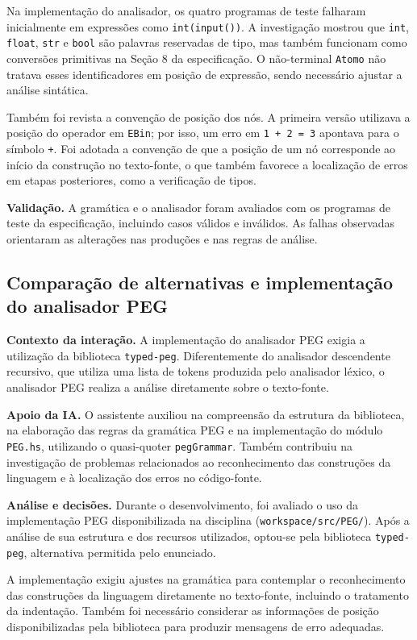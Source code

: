 Na implementação do analisador, os quatro programas de teste
falharam inicialmente em expressões como \texttt{int(input())}.
A investigação mostrou que \texttt{int}, \texttt{float},
\texttt{str} e \texttt{bool} são palavras reservadas de tipo,
mas também funcionam como conversões primitivas na Seção 8
da especificação. O não-terminal \texttt{Atomo} não tratava
esses identificadores em posição de expressão, sendo necessário
ajustar a análise sintática.

Também foi revista a convenção de posição dos nós. A primeira
versão utilizava a posição do operador em \texttt{EBin}; por
isso, um erro em \texttt{1 + 2 = 3} apontava para o símbolo
\texttt{+}. Foi adotada a convenção de que a posição de um nó
corresponde ao início da construção no texto-fonte, o que
também favorece a localização de erros em etapas posteriores,
como a verificação de tipos.

\textbf{Validação.} A gramática e o analisador foram avaliados
com os programas de teste da especificação, incluindo casos
válidos e inválidos. As falhas observadas orientaram as
alterações nas produções e nas regras de análise.

\subsection{Comparação de alternativas e implementação do analisador PEG}

\textbf{Contexto da interação.} A implementação do analisador PEG
exigia a utilização da biblioteca \texttt{typed-peg}. Diferentemente
do analisador descendente recursivo, que utiliza uma lista de tokens
produzida pelo analisador léxico, o analisador PEG realiza a análise
diretamente sobre o texto-fonte.

\textbf{Apoio da IA.} O assistente auxiliou na compreensão da
estrutura da biblioteca, na elaboração das regras da gramática PEG
e na implementação do módulo \texttt{PEG.hs}, utilizando o
quasi-quoter \texttt{pegGrammar}. Também contribuiu na investigação
de problemas relacionados ao reconhecimento das construções da
linguagem e à localização dos erros no código-fonte.

\textbf{Análise e decisões.} Durante o desenvolvimento, foi
avaliado o uso da implementação PEG disponibilizada na disciplina
(\texttt{workspace/src/PEG/}). Após a análise de sua estrutura
e dos recursos utilizados, optou-se pela biblioteca
\texttt{typed-peg}, alternativa permitida pelo enunciado.

A implementação exigiu ajustes na gramática para contemplar
o reconhecimento das construções da linguagem diretamente no
texto-fonte, incluindo o tratamento da indentação. Também foi
necessário considerar as informações de posição disponibilizadas
pela biblioteca para produzir mensagens de erro adequadas.

